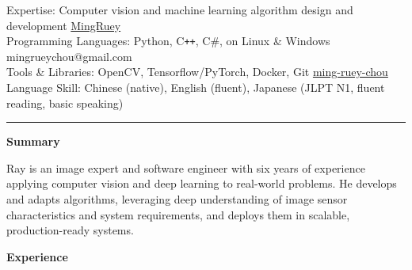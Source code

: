 \documentclass[10pt,A4]{article}
\newcommand{\cvsection}[2]
{
    \ifthenelse{\isempty{#1}}{}{
        \vspace{#1}
    }
	\begin{center}
		\large\textcolor{sectcol}{\textbf{#2}}
	\end{center}
}
\newcommand{\metasection}[2]
{
\footnotesize{#2} \hspace*{\fill} \footnotesize{#1}\\[1pt]
}
\newcommand{\cvevent}[8]
{
\begin{tabular*}{1\textwidth}{p{13.6cm} x {3.8cm}}
    \hspace{-8pt}\textbf{#2} - {#3} & \vspace{2pt}\textcolor{sectcol}{\emph{#1}}
\end{tabular*}

\ifthenelse{\isempty{#4}}{}{
    \vspace{2pt}\textcolor{darkgray}{\small\emph{#4}}
}

\vspace{-8pt}
\textcolor{softcol}{\hrule}

\ifthenelse{\isempty{#5}}{
    \vspace{4pt}
}{
    \vspace{6pt}{#5}
    \vspace{6pt}
}

\ifthenelse{\isempty{#6}}{}{
    \foreach \desc in {#6}{
        $\cdot$ \desc\\[3pt]
    }%
}

\ifthenelse{\isempty{#7}}{
}{
    \vspace{-10pt}
    \vspace{6pt}{#7}
    \vspace{6pt}
}

\ifthenelse{\isempty{#8}}{}{
    \foreach \desc in {#8}{
        $\cdot$ \desc\\[3pt]
    }%
}

\vspace{3pt}
}
\newcommand{\myref}[2] {\textcolor{gray}{\href{#2}{#1}}}
\begin{document}
\metasection{ \myref{MingRuey}{https://github.com/MingRuey}}{Expertise: Computer vision and machine learning algorithm design and development}
\metasection{ mingrueychou@gmail.com}{Programming Languages: Python, C\texttt{++}, C\#, on Linux \& Windows}
\metasection{ \myref{ming-ruey-chou}{https://www.linkedin.com/in/ming-ruey-chou}}{Tools \& Libraries: OpenCV, Tensorflow/PyTorch, Docker, Git}
\metasection{}{Language Skill: Chinese (native), English (fluent), Japanese (JLPT N1, fluent reading, basic speaking)}
\vspace{-2pt}
\textcolor{softcol}{\hrule}
\vspace{6pt}

\normalsize

\cvsection{-10pt}{Summary}
Ray is an image expert and software engineer with six years of experience applying computer vision and deep learning to real-world problems.
He develops and adapts algorithms, leveraging deep understanding of image sensor characteristics and system requirements, and deploys them in scalable, production-ready systems.

%
%

\cvsection{}{Experience}
\end{document}
